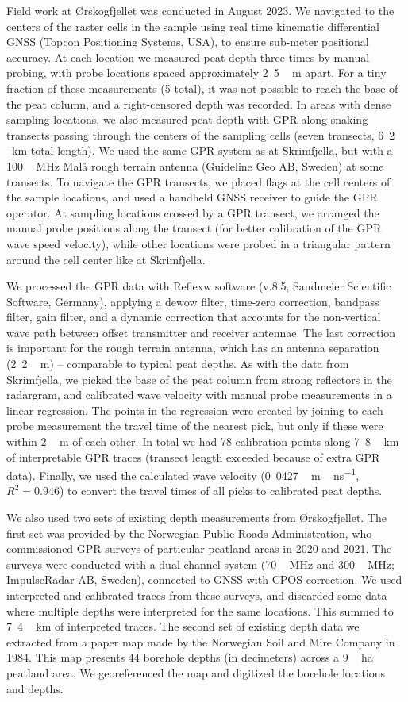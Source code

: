 \documentclass[soil, manuscript]{copernicus}
\begin{document}
Field work at Ørskogfjellet was conducted in August 2023.
We navigated to the centers of the raster cells in the sample using real time kinematic differential GNSS (Topcon Positioning Systems, USA), to ensure sub-meter positional accuracy.
At each location we measured peat depth three times by manual probing, with probe locations spaced approximately \unit{2.5\,m} apart.
For a tiny fraction of these measurements (5 total), it was not possible to reach the base of the peat column, and a right-censored depth was recorded.
In areas with dense sampling locations, we also measured peat depth with GPR along snaking transects passing through the centers of the sampling cells (seven transects, \unit{6.2\,km} total length).
We used the same GPR system as at Skrimfjella, but with a \unit{100\,MHz} Malå rough terrain antenna (Guideline Geo AB, Sweden) at some transects.
To navigate the GPR transects, we placed flags at the cell centers of the sample locations, and used a handheld GNSS receiver to guide the GPR operator.
At sampling locations crossed by a GPR transect, we arranged the manual probe positions along the transect (for better calibration of the GPR wave speed velocity), while other locations were probed in a triangular pattern around the cell center like at Skrimfjella.

We processed the GPR data with Reflexw software (v.8.5, Sandmeier Scientific Software, Germany), applying a dewow filter, time-zero correction, bandpass filter, gain filter, and a dynamic correction that accounts for the non-vertical wave path between offset transmitter and receiver antennae.
The last correction is important for the rough terrain antenna, which has an antenna separation (\unit{2.2\,m}) -- comparable to typical peat depths.
As with the data from Skrimfjella, we picked the base of the peat column from strong reflectors in the radargram, and calibrated wave velocity with manual probe measurements in a linear regression.
The points in the regression were created by joining to each probe measurement the travel time of the nearest pick, but only if these were within \unit{2\,m} of each other.
In total we had 78 calibration points along \unit{7.8\,km} of interpretable GPR traces (transect length exceeded because of extra GPR data).
Finally, we used the calculated wave velocity (\unit{0.0427\,m\,ns^{-1}}, \(R^2 = 0.946\)) to convert the travel times of all picks to calibrated peat depths.

We also used two sets of existing depth measurements from Ørskogfjellet.
The first set was provided by the Norwegian Public Roads Administration, who commissioned GPR surveys of particular peatland areas in 2020 and 2021.
The surveys were conducted with a dual channel system (\unit{70\,MHz} and \unit{300\,MHz}; ImpulseRadar AB, Sweden), connected to GNSS with CPOS correction.
We used interpreted and calibrated traces from these surveys, and discarded some data where multiple depths were interpreted for the same locations.
This summed to \unit{7.4\,km} of interpreted traces.
The second set of existing depth data we extracted from a paper map made by the Norwegian Soil and Mire Company in 1984.
This map presents 44 borehole depths (in decimeters) across a \unit{9\,ha} peatland area.
We georeferenced the map and digitized the borehole locations and depths.
\end{document}
